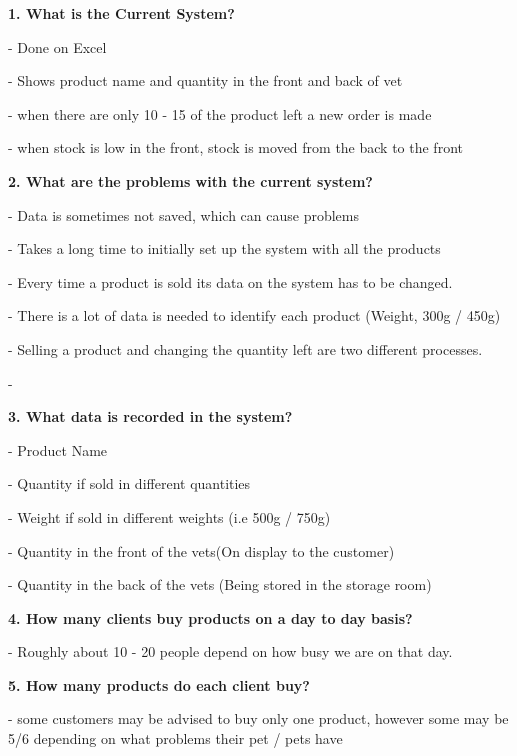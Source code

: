 	\begin{flushleft}

\textbf{1. What is the Current System?} \par
- Done on Excel\par
- Shows product name and quantity in the front and back of vet\par
- when there are only 10 - 15 of the product left a new order is made\par
- when stock is low in the front, stock is moved from the back to the front\par

\textbf{2. What are the problems with the current system?}\par
- Data is sometimes not saved, which can cause problems\par
- Takes a long time to initially set up the system with all the products\par
- Every time a product is sold its data on the system has to be changed.\par
- There is a lot of data is needed to identify each product (Weight, 300g / 450g)\par
- Selling a product and changing the quantity left are two different processes.\par
- 

\textbf{3. What data is recorded in the system?}\par
- Product Name\par
- Quantity if sold in different quantities\par
- Weight if sold in different weights (i.e 500g / 750g)\par
- Quantity in the front of the vets(On display to the customer)\par
- Quantity in the back of the vets (Being stored in the storage room)\par

\textbf{4. How many clients buy products on a day to day basis?}\par
- Roughly about 10 - 20 people depend on how busy we are on that day.\par

\textbf{5. How many products do each client buy?}\par
- some customers may be advised to buy only one product, however some may be 5/6 depending on what problems their pet / pets have\par


\end{flushleft}

